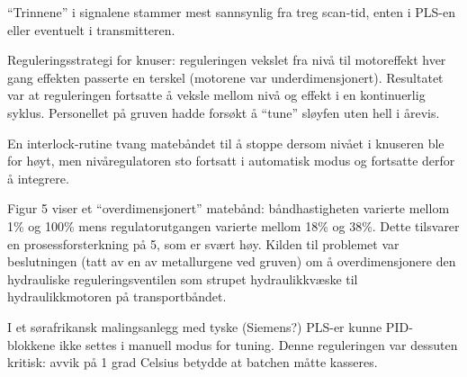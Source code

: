 












``Trinnene'' i signalene stammer mest sannsynlig fra treg scan-tid, enten i PLS-en eller eventuelt i transmitteren.

\vskip 10pt

Reguleringsstrategi for knuser: reguleringen vekslet fra nivå til motoreffekt hver gang effekten passerte en terskel (motorene var underdimensjonert). Resultatet var at reguleringen fortsatte å veksle mellom nivå og effekt i en kontinuerlig syklus. Personellet på gruven hadde forsøkt å ``tune'' sløyfen uten hell i årevis.

\vskip 10pt

En interlock-rutine tvang matebåndet til å stoppe dersom nivået i knuseren ble for høyt, men nivåregulatoren sto fortsatt i automatisk modus og fortsatte derfor å integrere.

\vskip 10pt

Figur 5 viser et ``overdimensjonert'' matebånd: båndhastigheten varierte mellom 1\% og 100\% mens regulatorutgangen varierte mellom 18\% og 38\%. Dette tilsvarer en prosessforsterkning på 5, som er svært høy. Kilden til problemet var beslutningen (tatt av en av metallurgene ved gruven) om å overdimensjonere den hydrauliske reguleringsventilen som strupet hydraulikkvæske til hydraulikkmotoren på transportbåndet.

\vskip 10pt

I et sørafrikansk malingsanlegg med tyske (Siemens?) PLS-er kunne PID-blokkene ikke settes i manuell modus for tuning. Denne reguleringen var dessuten kritisk: avvik på 1 grad Celsius betydde at batchen måtte kasseres.









